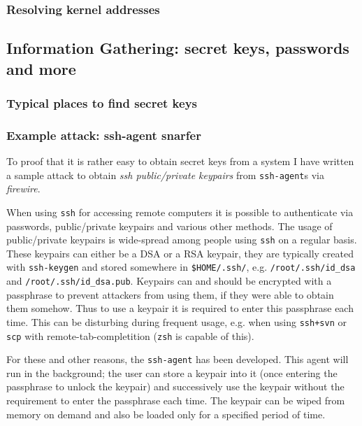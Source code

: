 \subsubsection{Resolving kernel addresses}



\subsection{Information Gathering: secret keys, passwords and more}

\subsubsection{Typical places to find secret keys}

\subsubsection{Example attack: ssh-agent snarfer}

To proof that it is rather easy to obtain secret keys from a system I have
written a sample attack to obtain \emph{ssh public/private keypairs} from
\texttt{ssh-agent}s via \emph{firewire}.

When using \texttt{ssh} for accessing remote computers it is possible to
authenticate via passwords, public/private keypairs and various other methods.
The usage of public/private keypairs is wide-spread among people using
\texttt{ssh} on a regular basis. These keypairs can either be a DSA or a RSA
keypair, they are typically created with \texttt{ssh-keygen} and stored
somewhere in \texttt{\$HOME/.ssh/}, e.g.  \texttt{/root/.ssh/id\_dsa} and
\texttt{/root/.ssh/id\_dsa.pub}. Keypairs can and should be encrypted with a
passphrase to prevent attackers from using them, if they were able to obtain
them somehow. Thus to use a keypair it is required to enter this passphrase each
time. This can be disturbing during frequent usage, e.g. when using
\texttt{ssh+svn} or \texttt{scp} with remote-tab-completition (\texttt{zsh} is
capable of this).

For these and other reasons, the \texttt{ssh-agent} has been developed. This
agent will run in the background; the user can store a keypair into it (once
entering the passphrase to unlock the keypair) and successively use the keypair
without the requirement to enter the passphrase each time. The keypair can be
wiped from memory on demand and also be loaded only for a specified period of
time.

